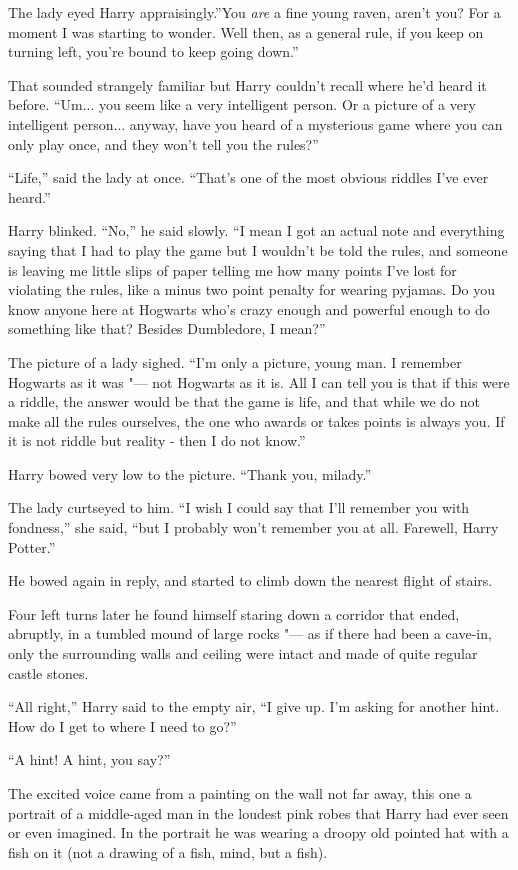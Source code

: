 The lady eyed Harry appraisingly.''You \emph{are} a fine young raven,
aren't you? For a moment I was starting to wonder. Well then, as a
general rule, if you keep on turning left, you're bound to keep going
down.''

That sounded strangely familiar but Harry couldn't recall where he'd
heard it before. ``Um... you seem like a very intelligent person.
Or a picture of a very intelligent person... anyway, have you heard
of a mysterious game where you can only play once, and they won't tell
you the rules?''

``Life,'' said the lady at once. ``That's one of the most obvious
riddles I've ever heard.''

Harry blinked. ``No,'' he said slowly. ``I mean I got an actual note and
everything saying that I had to play the game but I wouldn't be told the
rules, and someone is leaving me little slips of paper telling me how
many points I've lost for violating the rules, like a minus two point
penalty for wearing pyjamas. Do you know anyone here at Hogwarts who's
crazy enough and powerful enough to do something like that? Besides
Dumbledore, I mean?''

The picture of a lady sighed. ``I'm only a picture, young man. I
remember Hogwarts as it was "--- not Hogwarts as it is. All I can tell you
is that if this were a riddle, the answer would be that the game is
life, and that while we do not make all the rules ourselves, the one who
awards or takes points is always you. If it is not riddle but reality -
then I do not know.''

Harry bowed very low to the picture. ``Thank you, milady.''

The lady curtseyed to him. ``I wish I could say that I'll remember you
with fondness,'' she said, ``but I probably won't remember you at all.
Farewell, Harry Potter.''

He bowed again in reply, and started to climb down the nearest flight of
stairs.

Four left turns later he found himself staring down a corridor that
ended, abruptly, in a tumbled mound of large rocks "--- as if there had
been a cave-in, only the surrounding walls and ceiling were intact and
made of quite regular castle stones.

``All right,'' Harry said to the empty air, ``I give up. I'm asking for
another hint. How do I get to where I need to go?''

``A hint! A hint, you say?''

The excited voice came from a painting on the wall not far away, this
one a portrait of a middle-aged man in the loudest pink robes that Harry
had ever seen or even imagined. In the portrait he was wearing a droopy
old pointed hat with a fish on it (not a drawing of a fish, mind, but a
fish).

